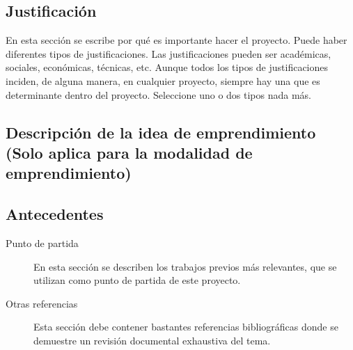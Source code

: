 \documentclass{article}
\begin{document}
\subsection*{Justificación}
\noindent En esta sección se escribe por qué es importante hacer el proyecto. Puede haber diferentes tipos de justificaciones. Las justificaciones pueden ser académicas, sociales, económicas, técnicas, etc. Aunque todos los tipos de justificaciones inciden, de alguna manera, en cualquier proyecto, siempre hay una que es determinante dentro del proyecto. Seleccione uno o dos tipos nada más. %

\subsection*{Descripción de la idea de emprendimiento \\ {\scriptsize(Solo aplica para la modalidad de emprendimiento)}}
\noindent %

\subsection*{Antecedentes}

\begin{description}
\item[Punto de partida] En esta sección se describen los trabajos previos más  relevantes, que se utilizan como punto de partida de este proyecto. 



\item[Otras referencias] Esta sección debe contener bastantes referencias bibliográficas donde se demuestre un revisión documental exhaustiva del tema. %
\end{description}
\end{document}
